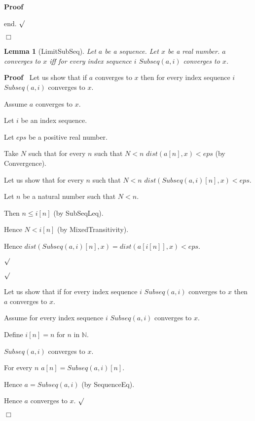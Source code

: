 \documentclass{article}
\newenvironment{forthel}{\begin{leftbar}}{\end{leftbar}}
\newenvironment{proof}{\noindent\textbf{Proof\ }}{\hspace*{\fill}$\Box$\medskip}
\newenvironment{subproof}{\begin{list}{}{}
		\item[\text{Proof}]}{\hfill $\surd$ \end{list}}
\newtheorem{lemma}{Lemma}
\newcommand{\NN}{\mathbb{N}}
\begin{document}
\begin{forthel}
\begin{proof}
\begin{subproof}
		end.
		\end{subproof}
	\end{proof}
	
	\begin{lemma}[LimitSubSeq]
		Let $a$ be a sequence. Let $x$ be a real number. $a$ converges to $x$ iff for every index sequence $i$ $Subseq(a,i)$ converges to $x$. 
	\end{lemma}
	\begin{proof}
		Let us show that if $a$ converges to $x$ then for every index sequence $i$ $Subseq(a,i)$ converges to $x$.
		
		\begin{subproof}
			Assume $a$ converges to $x$.
			
			Let $i$ be an index sequence.
			
			Let $eps$ be a positive real number.
			
			Take $N$ such that for every $n$ such that $N < n$ $dist(a[n],x) < eps$ (by Convergence).
			
			Let us show that for every $n$ such that $N < n$ $dist(Subseq(a,i)[n],x) < eps$.
			
			\begin{subproof}
				Let $n$ be a natural number such that $N < n$.
				
				Then $n \leq i[n]$ (by SubSeqLeq). 
				
				Hence $N < i[n]$ (by MixedTransitivity). 
				
				Hence $dist(Subseq(a,i)[n],x) = dist(a[i[n]],x) < eps$.

			\end{subproof}
			
		\end{subproof}
		
		Let us show that if for every index sequence $i$ $Subseq(a,i)$ converges to $x$ then $a$ converges to $x$. 
		
		\begin{subproof}
			Assume for every index sequence $i$ $Subseq(a,i)$ converges to $x$. 
			
			Define $i[n] = n$ for $n$ in $\NN$.
			
			$Subseq(a,i)$ converges to $x$.
			
			For every $n$ $a[n] = Subseq(a,i)[n]$.
			
			Hence $a = Subseq(a,i)$ (by SequenceEq).
			
			Hence $a$ converges to $x$.
		\end{subproof}
	\end{proof}
	

\end{forthel}
\end{document}
